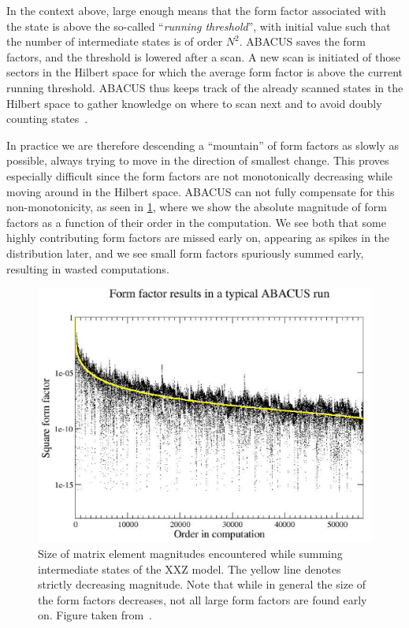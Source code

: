 \documentclass[11pt, a4paper]{report} %
\begin{document}
In the context above, large enough means that the form factor associated with the state is above the so-called ``\textit{running threshold}'', with initial value such that the number of intermediate states is of order \(N^2\).
ABACUS saves the form factors, and the threshold is lowered after a scan. 
A new scan is initiated of those sectors in the Hilbert space for which the average form factor is above the current running threshold.
ABACUS thus keeps track of the already scanned states in the Hilbert space to gather knowledge on where to scan next and to avoid doubly counting states~\cite{Caux2009}.

In practice we are therefore descending a ``mountain'' of form factors as slowly as possible, always trying to move in the direction of smallest change.
This proves especially difficult since the form factors are not monotonically decreasing while moving around in the Hilbert space.
ABACUS can not fully compensate for this non-monotonicity, as seen in \cref{fig:orderedmagnitudes}, where we show the absolute magnitude of form factors as a function of their order in the computation.
We see both that some highly contributing form factors are missed early on, appearing as spikes in the distribution later, and we see small form factors spuriously summed early, resulting in wasted computations.
\begin{figure}[tb!]
  \centering
  \includegraphics[width=\textwidth]{FFsq_vs_order_D0p6N50M20_small}
  \caption{Size of matrix element magnitudes encountered while summing intermediate states of the XXZ model. The yellow line denotes strictly decreasing magnitude. Note that while in general the size of the form factors decreases, not all large form factors are found early on. Figure taken from~\cite{Caux2009}.}\label{fig:orderedmagnitudes}
\end{figure}
\end{document}
